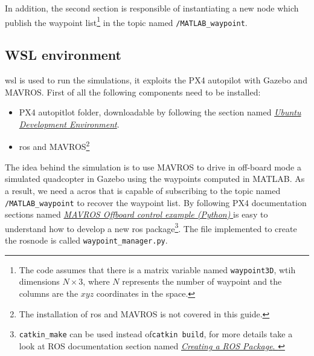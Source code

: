 In addition, the second section is responsible of instantiating a new node which publish the waypoint list\footnote{The code assumes that there is a matrix variable named \texttt{waypoint3D}, wtih dimensions $N \times 3$, where $N$ represents the number of waypoint and the columns are the $xyz$ coordinates in the space.} in the topic named \texttt{/MATLAB\_waypoint}.


\subsection{WSL environment}
\ac{wsl} is used to run the simulations, it exploits the PX4 autopilot with Gazebo and MAVROS. First of all the following components need to be installed:
\begin{itemize}
	\item PX4 autopitlot folder, downloadable by following the section named \href{https://docs.px4.io/main/en/dev_setup/dev_env_linux_ubuntu.html}{\textit{Ubuntu Development Environment}}. 
	\item \ac{ros} and MAVROS\footnote{The installation of \ac{ros} and MAVROS is not covered in this guide.}
\end{itemize}
The idea behind the simulation is to use MAVROS to drive in off-board mode a simulated quadcopter in Gazebo using the waypoints computed in MATLAB. As a result, we need a ac{ros} that is capable of subscribing to the topic named \texttt{/MATLAB\_waypoint} to recover the waypoint list. By following PX4 documentation sections named \href{https://docs.px4.io/main/en/ros/mavros_offboard_python.html}{\textit{MAVROS Offboard control example (Python)
}} is easy to understand how to develop a new \ac{ros} package\footnote{\texttt{catkin\_make} can be used instead of\texttt{catkin build}, for more details take a look at ROS documentation section named \href{http://wiki.ros.org/ROS/Tutorials/CreatingPackage}{\textit{Creating a ROS Package}.
}}.
The file implemented to create the rosnode is called \texttt{waypoint\_manager.py}. 

